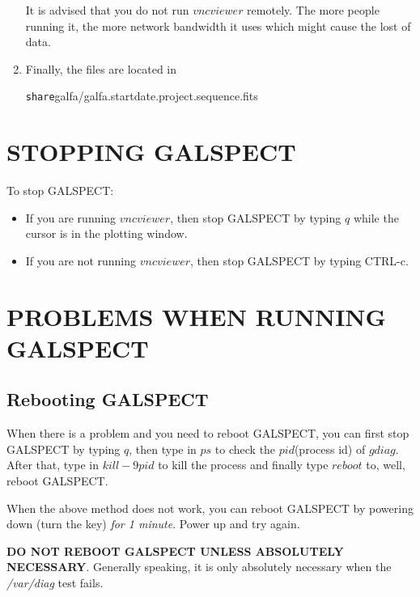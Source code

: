 \documentclass[psfig,preprint]{aastex}
\begin{document}
\begin{enumerate}
	It is advised that you do not run $vncviewer$ remotely.  
The more people running it, the more
network bandwidth it uses which might cause the lost of data.  

\item Finally, the files are located in 

{\verb /share/galfa/galfa.startdate.project.sequence.fits }

\end{enumerate}

\section{ STOPPING GALSPECT} \label{stop}

	To stop GALSPECT: \begin{itemize}

\item If you are running $vncviewer$, then stop GALSPECT by typing $q$
while the cursor is in the plotting window.

\item If you are not running $vncviewer$, then stop GALSPECT by typing
CTRL-c.

\end{itemize}

\section{ PROBLEMS WHEN RUNNING GALSPECT} \label{problems}

\subsection{Rebooting GALSPECT} \label{rebooting}

	When there is a problem and you need to reboot GALSPECT, 
you can first stop GALSPECT 
by typing $q$, then type in $ps$ to check the $pid$(process id) of $gdiag$.  
After that, type in $kill -9 pid$ to kill the process
and finally type $reboot$ to, well, reboot GALSPECT.

	When the above method does not work, you can reboot GALSPECT by powering down 
(turn the key) {\it for 1 minute}.  Power up and try again. 

	{\bf DO NOT REBOOT GALSPECT UNLESS ABSOLUTELY NECESSARY}.
Generally speaking, it is only absolutely necessary when 
the {\it /var/diag} test fails.
\end{document}
